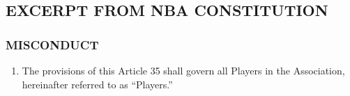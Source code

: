 \documentclass[
]{book}
\providecommand{\tightlist}{%
  \setlength{\itemsep}{0pt}\setlength{\parskip}{0pt}}
\begin{document}
\newpage

\hypertarget{excerpt-from-nba-constitution}{%
\subsection{EXCERPT FROM NBA CONSTITUTION}\label{excerpt-from-nba-constitution}}

\hypertarget{misconduct}{%
\subsubsection{MISCONDUCT}\label{misconduct}}

\begin{enumerate}
\def\labelenumi{\arabic{enumi}.}
\setcounter{enumi}{34}
\tightlist
\item
  The provisions of this Article 35 shall govern all Players in the Association, hereinafter referred to as ``Players.''


\end{enumerate}
\end{document}
